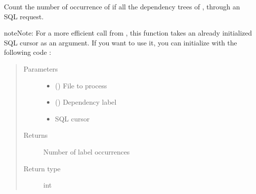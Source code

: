 \documentclass[letterpaper,10pt,english]{sphinxmanual}
\begin{document}

\begin{fulllineitems}
\label{\detokenize{analysis:loacore.analysis.frequencies.count_label}}
Count the number of occurrence of  if all the dependency trees of , through an SQL request.

\begin{sphinxadmonition}{note}{Note:}
For a more efficient call from {\hyperref[\detokenize{analysis:loacore.analysis.frequencies.label_frequencies}]{}}, this function takes an already initialized SQL
cursor as an argument.
If you want to use it, you can initialize  with the following code :

%
\begin{sphinxVerbatim}[commandchars=\\\{\}]
   
   
  
  
\end{sphinxVerbatim}
\end{sphinxadmonition}
\begin{quote}\begin{description}
\item[{Parameters}] \leavevmode\begin{itemize}
\item {} 
 () \textendash{} File to process

\item {} 
 () \textendash{} Dependency label

\item {} 
 \textendash{} SQL cursor

\end{itemize}

\item[{Returns}] \leavevmode
Number of label occurrences

\item[{Return type}] \leavevmode
int

\end{description}\end{quote}

\end{fulllineitems}
\end{document}
